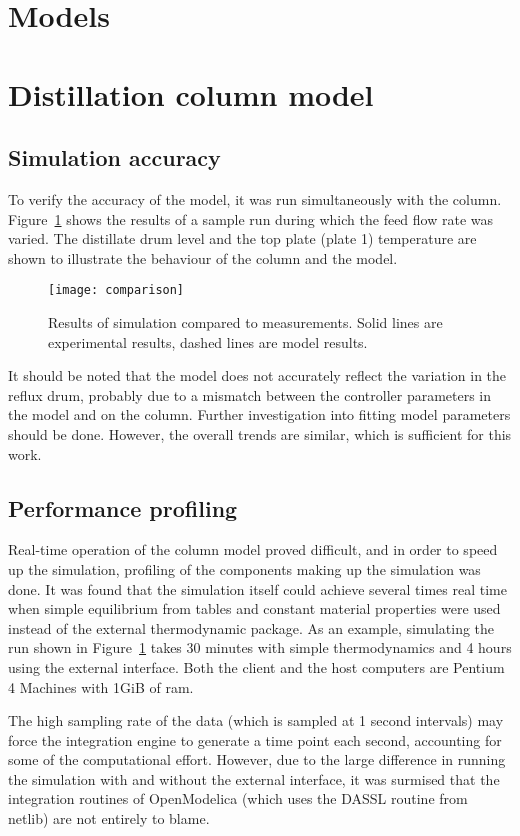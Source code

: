 \section{Models}

\section{Distillation column model}
\subsection{Simulation accuracy}
To verify the accuracy of the model, it was run simultaneously with
the column.  Figure~\ref{fig:comparison} shows the results of a sample
run during which the feed flow rate was varied.  The distillate drum
level and the top plate (plate 1) temperature are shown to illustrate
the behaviour of the column and the model.

\label{sec:results}
\begin{figure}[htbp]
  \centering
  \texttt{[image: comparison]}
  \caption{Results of simulation compared to measurements.  Solid
    lines are experimental results, dashed lines are model results.}
  \label{fig:comparison}
\end{figure}

It should be noted that the model does not accurately reflect the variation in
the reflux drum, probably due to a mismatch between the controller parameters in
the model and on the column.  Further investigation into fitting model
parameters should be done.  However, the overall trends are similar, which is
sufficient for this work.

\subsection{Performance profiling}
Real-time operation of the column model proved difficult, and in order
to speed up the simulation, profiling of the components making up the
simulation was done.  It was found that the simulation itself could
achieve several times real time when simple equilibrium from tables
and constant material properties were used instead of the external
thermodynamic package.  As an example, simulating the run shown in
Figure~\ref{fig:comparison} takes 30 minutes with simple
thermodynamics and 4 hours using the external interface.  Both the client and
the host computers are Pentium 4 Machines with 1GiB of ram.

The high sampling rate of the data (which is sampled at 1 second
intervals) may force the integration engine to generate a time point
each second, accounting for some of the computational effort.
However, due to the large difference in running the simulation with
and without the external interface, it was surmised that the
integration routines of OpenModelica (which uses the DASSL routine
from netlib) are not entirely to blame.

